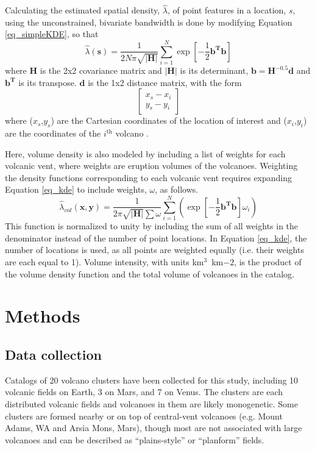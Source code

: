 Calculating the estimated spatial density, $\hat{\lambda}$, of point features in a location, $s$, using the unconstrained, bivariate bandwidth is done by modifying Equation \ref{eq_simpleKDE}, so that
\begin{equation}
\hat{\lambda}(\mathbf{s})=\frac{1}{2N\pi\sqrt{|\mathbf{H}|}}\sum\limits_{i=1}^{N}\exp\left[-\frac{1}{2}\mathbf{b^Tb}\right]
\label{eq_kde}
\end{equation}
where $\mathbf{H}$ is the 2x2 covariance matrix and $|\mathbf{H}|$ is its determinant, $\mathbf{b}=\mathbf{H}^{-0.5}\mathbf{d}$ and $\mathbf{b^T}$ is its transpose. $\mathbf{d}$ is the 1x2 distance matrix, with the form
\begin{equation}\begin{bmatrix}
x_s-x_i\\
y_s-y_i
\label{eq_distancematrix}
\end{bmatrix}\end{equation}
where ($x_s$,$y_s$) are the Cartesian coordinates of the location of interest and ($x_i$,$y_i$) are the coordinates of the $i^{\text{th}}$ volcano \citep{connor2015probabilistic}.

Here, volume density is also modeled by including a list of weights for each volcanic vent, where weights are eruption volumes of the volcanoes. Weighting the density functions corresponding to each volcanic vent requires expanding Equation \ref{eq_kde} to include weights, $\omega$, as follows.
\begin{equation}
\hat{\lambda}_{vol}(\mathbf{x,y})=\frac{1}{2\pi\sqrt{|\mathbf{H}|}\sum{\omega}}\sum\limits_{i=1}^{N}\left(\exp\left[-\frac{1}{2}\mathbf{b^Tb}\right]\omega_i\right)
\label{eq_weigthedkde}
\end{equation}
This function is normalized to unity by including the sum of all weights in the denominator instead of the number of point locations. In Equation \ref{eq_kde}, the number of locations is used, as all points are weighted equally (i.e. their weights are each equal to 1). Volume intensity, with units km$^3$~km${-2}$, is the product of the volume density function and the total volume of volcanoes in the catalog.

\section{Methods}

\subsection{Data collection}
Catalogs of 20 volcano clusters have been collected for this study, including 10 volcanic fields on Earth, 3 on Mars, and 7 on Venus. The clusters are each distributed volcanic fields and volcanoes in them are likely monogenetic. Some clusters are formed nearby or on top of central-vent volcanoes (e.g. Mount Adams, WA and Arsia Mons, Mars), though most are not associated with large volcanoes and can be described as ``plains-style'' \citep{greeley1977basaltic} or ``planform'' \citep{settle1979structure} fields. 

